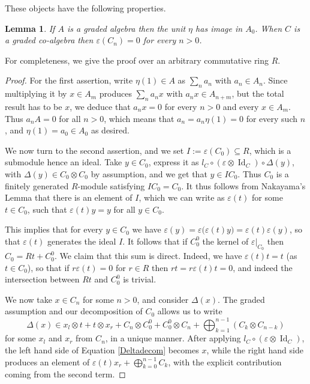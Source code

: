 \documentclass{article}
\newtheorem{lem}[thm]{Lemma}
\theoremstyle{definition}
\begin{document}
\medskip

These objects have the following properties.
\begin{lem}
If $A$ is a graded algebra then the unit $\eta$ has image in $A_{0}$. When $C$ is a graded co-algebra then $\varepsilon(C_{n})=0$ for every $n>0$. \label{propgr}
\end{lem}
For completeness, we give the proof over an arbitrary commutative ring $R$.
\begin{proof}
For the first assertion, write $\eta(1) \in A$ as $\sum_{n}a_{n}$ with $a_{n} \in A_{n}$. Since multiplying it by $x \in A_{m}$ produces $\sum_{n}a_{n}x$ with $a_{n}x \in A_{n+m}$, but the total result has to be $x$, we deduce that $a_{n}x=0$ for every $n>0$ and every $x \in A_{m}$. Thus $a_{n}A=0$ for all $n>0$, which means that $a_{n}=a_{n}\eta(1)=0$ for every such $n$, and $\eta(1)=a_{0} \in A_{0}$ as desired.

We now turn to the second assertion, and we set $I:=\varepsilon(C_{0}) \subseteq R$, which is a submodule hence an ideal. Take $y \in C_{0}$, express it as $l_{C}\circ(\varepsilon\otimes\operatorname{Id}_{C})\circ\Delta(y)$, with $\Delta(y) \in C_{0} \otimes C_{0}$ by assumption, and we get that $y \in IC_{0}$. Thus $C_{0}$ is a finitely generated $R$-module satisfying $IC_{0}=C_{0}$. It thus follows from Nakayama's Lemma that there is an element of $I$, which we can write as $\varepsilon(t)$ for some $t \in C_{0}$, such that $\varepsilon(t)y=y$ for all $y \in C_{0}$.

This implies that for every $y \in C_{0}$ we have $\varepsilon(y)=\varepsilon\big(\varepsilon(t)y\big)=\varepsilon(t)\varepsilon(y)$, so that $\varepsilon(t)$ generates the ideal $I$. It follows that if $C_{0}^{0}$ the kernel of $\varepsilon|_{C_{0}}$ then $C_{0}=Rt+C_{0}^{0}$. We claim that this sum is direct. Indeed, we have $\varepsilon(t)t=t$ (as $t \in C_{0}$), so that if $r\varepsilon(t)=0$ for $r \in R$ then $rt=r\varepsilon(t)t=0$, and indeed the intersection between $Rt$ and $C_{0}^{0}$ is trivial.

We now take $x \in C_{n}$ for some $n>0$, and consider $\Delta(x)$. The graded assumption and our decomposition of $C_{0}$ allows us to write
\begin{equation}
\Delta(x) \in x_{l} \otimes t+t \otimes x_{r}+C_{n} \otimes C_{0}^{0}+C_{0}^{0} \otimes C_{n}+\bigoplus_{k=1}^{n-1}(C_{k} \otimes C_{n-k}) \label{Deltadecom}
\end{equation}
for some $x_{l}$ and $x_{r}$ from $C_{n}$, in a unique manner. After applying $l_{C}\circ(\varepsilon\otimes\operatorname{Id}_{C})$, the left hand side of Equation \eqref{Deltadecom} becomes $x$, while the right hand side produces an element of $\varepsilon(t)x_{r}+\bigoplus_{k=0}^{n-1}C_{k}$, with the explicit contribution coming from the second term.


\end{proof}
\end{document}
